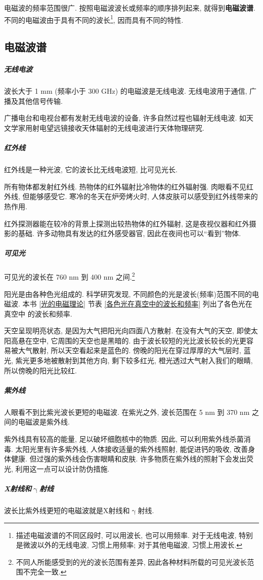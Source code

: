 \documentclass[11pt,a4paper]{ctexbook}
\begin{document}
电磁波的频率范围很广. 按照电磁波波长或频率的顺序排列起来, 就得到\textbf{电磁波谱}.
不同的电磁波由于具有不同的波长\footnote{描述电磁波谱的不同区段时, 可以用波长, 也可以用频率.
对于无线电波, 特别是微波以外的无线电波, 习惯上用频率; 对于其他电磁波, 习惯上用波长.},
因而具有不同的特性.

\subsection{电磁波谱}

\subparagraph{无线电波} 波长大于 1 mm (频率小于 300 GHz) 的电磁波是无线电波.
无线电波用于通信, 广播及其他信号传输.

广播电台和电视台都有发射无线电波的设备, 许多自然过程也辐射无线电波.
如天文学家用射电望远镜接收天体辐射的无线电波进行天体物理研究.

\subparagraph{红外线} 红外线是一种光波, 它的波长比无线电波短, 比可见光长.

所有物体都发射红外线. 热物体的红外辐射比冷物体的红外辐射强. 肉眼看不见红外线, 但能够感受它.
寒冷的冬天在炉旁烤火时, 人体皮肤可以感受到红外线带来的热作用.

红外探测器能在较冷的背景上探测出较热物体的红外辐射, 这是夜视仪器和红外摄影的基础.
许多动物具有发达的红外感受器官, 因此在夜间也可以``看到''物体.

\subparagraph{可见光} 可见光的波长在 760 nm 到 400 nm 之间.\footnote{不同人所能感受到的光的波长范围有差异,
因此各种材料所载的可见光波长范围不完全一致.}

阳光是由各种色光组成的. 科学研究发现, 不同颜色的光是波长(频率)范围不同的电磁波.
本书 \ref{光的电磁理论} 节表 \ref{各色光在真空中的波长和频率} 列出了各色光在真空中
的波长和频率.

天空呈现明亮状态, 是因为大气把阳光向四面八方散射. 在没有大气的天空, 即使太阳高悬在空中,
它周围的天空也是黑暗的. 由于波长较短的光比波长较长的光更容易被大气散射,
所以天空看起来是蓝色的. 傍晚的阳光在穿过厚厚的大气层时,
蓝光, 紫光更多地被散射到其他方向, 剩下较多红光, 橙光透过大气射入我们的眼睛, 所以傍晚的阳光比较红.

\subparagraph{紫外线}人眼看不到比紫光波长更短的电磁波. 在紫光之外, 波长范围在 5 nm 到 370 nm
之间的电磁波是紫外线.

紫外线具有较高的能量, 足以破坏细胞核中的物质. 因此, 可以利用紫外线杀菌消毒.
太阳光里有许多紫外线, 人体接收适量的紫外线照射, 能促进钙的吸收, 改善身体健康.
但过强的紫外线会伤害眼睛和皮肤. 许多物质在紫外线的照射下会发出荧光, 利用这一点可以设计防伪措施.

\subparagraph{X射线和$\upgamma$射线} 波长比紫外线更短的电磁波就是X射线和$\upgamma$射线.
\end{document}
